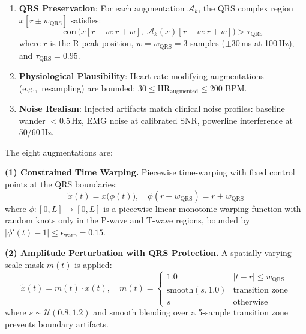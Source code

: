 \documentclass[journal,10pt]{IEEEtran}
\newcommand{\eg}{e.g.,~}
\begin{document}
\begin{enumerate}
    \item \textbf{QRS Preservation}: For each augmentation $\mathcal{A}_k$, the QRS complex region $x[r \pm w_{\text{QRS}}]$ satisfies:
    \begin{equation}
        \text{corr}\Big(x[r\!-\!w : r\!+\!w],\; \mathcal{A}_k(x)[r\!-\!w : r\!+\!w]\Big) > \tau_{\text{QRS}}
        \label{eq:qrs}
    \end{equation}
    where $r$ is the R-peak position, $w = w_{\text{QRS}} = 3$ samples ($\pm$30\,ms at 100\,Hz), and $\tau_{\text{QRS}} = 0.95$.
    
    \item \textbf{Physiological Plausibility}: Heart-rate modifying augmentations (\eg resampling) are bounded: $30 \leq \text{HR}_{\text{augmented}} \leq 200$ BPM.
    
    \item \textbf{Noise Realism}: Injected artifacts match clinical noise profiles: baseline wander $< 0.5$\,Hz, EMG noise at calibrated SNR, powerline interference at 50/60\,Hz.
\end{enumerate}

\vspace{0.5em}
\noindent The eight augmentations are:

\vspace{0.3em}
\noindent\textbf{(1) Constrained Time Warping.} Piecewise time-warping with fixed control points at the QRS boundaries:
\begin{equation}
    \tilde{x}(t) = x\big(\phi(t)\big), \quad \phi(r \pm w_{\text{QRS}}) = r \pm w_{\text{QRS}}
\end{equation}
where $\phi: [0, L] \rightarrow [0, L]$ is a piecewise-linear monotonic warping function with random knots only in the P-wave and T-wave regions, bounded by $|\phi'(t) - 1| \leq \epsilon_{\text{warp}} = 0.15$.

\vspace{0.3em}
\noindent\textbf{(2) Amplitude Perturbation with QRS Protection.} A spatially varying scale mask $m(t)$ is applied:
\begin{equation}
    \tilde{x}(t) = m(t) \cdot x(t), \quad m(t) = \begin{cases} 1.0 & |t - r| \leq w_{\text{QRS}} \\ \text{smooth}(s, 1.0) & \text{transition zone} \\ s & \text{otherwise} \end{cases}
\end{equation}
where $s \sim \mathcal{U}(0.8, 1.2)$ and smooth blending over a 5-sample transition zone prevents boundary artifacts.
\end{document}
